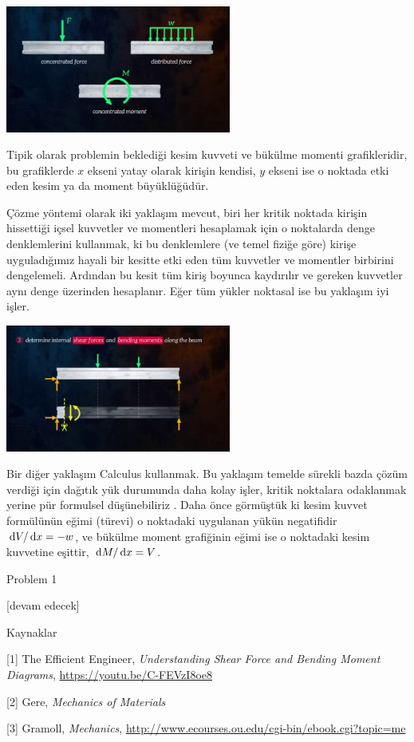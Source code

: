 \documentclass[12pt,fleqn]{article}\usepackage{../../common}
\begin{document}
\includegraphics[width=20em]{phy_020_strs_01b_02.jpg}

Tipik olarak problemin beklediği kesim kuvveti ve bükülme momenti grafikleridir,
bu grafiklerde $x$ ekseni yatay olarak kirişin kendisi, $y$ ekseni ise o noktada
etki eden kesim ya da moment büyüklüğüdür.

Çözme yöntemi olarak iki yaklaşım mevcut, biri her kritik noktada kirişin
hissettiği içsel kuvvetler ve momentleri hesaplamak için o noktalarda denge
denklemlerini kullanmak, ki bu denklemlere (ve temel fiziğe göre) kirişe
uyguladığımız hayali bir kesitte etki eden tüm kuvvetler ve momentler birbirini
dengelemeli. Ardından bu kesit tüm kiriş boyunca kaydırılır ve gereken kuvvetler
aynı denge üzerinden hesaplanır. Eğer tüm yükler noktasal ise bu yaklaşım iyi
işler.

\includegraphics[width=20em]{phy_020_strs_01b_03.jpg}

Bir diğer yaklaşım Calculus kullanmak. Bu yaklaşım temelde sürekli bazda çözüm
verdiği için dağıtık yük durumunda daha kolay işler, kritik noktalara odaklanmak
yerine pür formulsel düşünebiliriz . Daha önce görmüştük ki kesim kuvvet
formülünün eğimi (türevi) o noktadaki uygulanan yükün negatifidir
$\,\mathrm{d} V / \,\mathrm{d} x = -w$, ve bükülme moment grafiğinin eğimi ise o noktadaki
kesim kuvvetine eşittir, $\,\mathrm{d} M / \,\mathrm{d} x = V$.

Problem 1














[devam edecek]

Kaynaklar 

[1] The Efficient Engineer, {\em Understanding Shear Force and Bending Moment Diagrams},
    \url{https://youtu.be/C-FEVzI8oe8}

[2] Gere, {\em Mechanics of Materials}

[3] Gramoll, {\em Mechanics},
    \url{http://www.ecourses.ou.edu/cgi-bin/ebook.cgi?topic=me}
\end{document}
